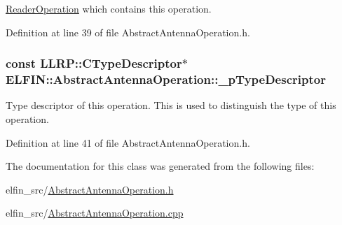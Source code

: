 \hyperlink{class_e_l_f_i_n_1_1_reader_operation}{Reader\-Operation} which contains this operation. 



Definition at line 39 of file Abstract\-Antenna\-Operation.\-h.

\hypertarget{class_e_l_f_i_n_1_1_abstract_antenna_operation_ae656ecd50678637a29a66743ceda3e86}{
\subsubsection[{\-\_\-p\-Type\-Descriptor}]{\setlength{\rightskip}{0pt plus 5cm}const L\-L\-R\-P\-::\-C\-Type\-Descriptor$\ast$ E\-L\-F\-I\-N\-::\-Abstract\-Antenna\-Operation\-::\-\_\-p\-Type\-Descriptor}}\label{class_e_l_f_i_n_1_1_abstract_antenna_operation_ae656ecd50678637a29a66743ceda3e86}


Type descriptor of this operation. This is used to distinguish the type of this operation. 



Definition at line 41 of file Abstract\-Antenna\-Operation.\-h.



The documentation for this class was generated from the following files\-:\begin{DoxyCompactItemize}
\item 
elfin\-\_\-src/\hyperlink{_abstract_antenna_operation_8h}{Abstract\-Antenna\-Operation.\-h}\item 
elfin\-\_\-src/\hyperlink{_abstract_antenna_operation_8cpp}{Abstract\-Antenna\-Operation.\-cpp}\end{DoxyCompactItemize}
